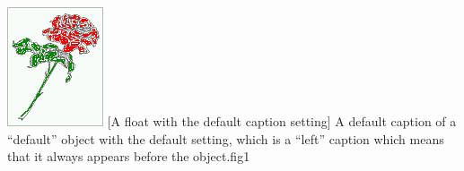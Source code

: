 \documentclass[twocolumn]{scrartcl}
\begin{document}
\Float[default]
%
  {\includegraphics{frose}}%
  [A  float with the default caption setting]%
  {A default caption of a ``default'' object with the default setting, which
   is a ``left''  caption which means that it always appears before the object.}{fig1}

\blinddocument

\Blindtext

\blindtext
\end{document}
